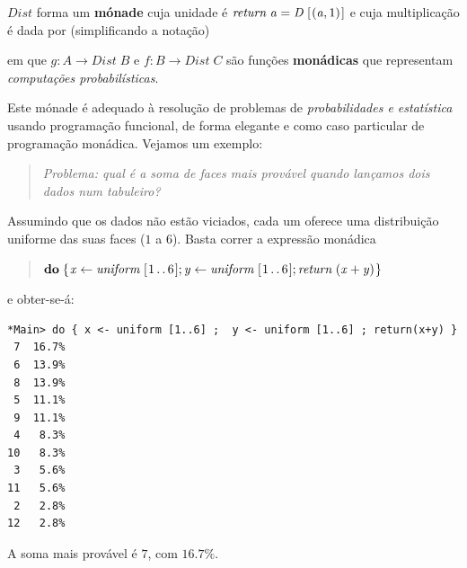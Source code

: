 \documentclass[a4paper]{article}
\newcommand{\Conid}[1]{\mathit{#1}}
\newcommand{\Varid}[1]{\mathit{#1}}
\def\resethooks{%
  \global\let\SaveRestoreHook\empty
  \global\let\ColumnHook\empty}
\let\hspre\empty
\let\hspost\empty
\def\kcomp{\mathbin{\bullet}}
\begin{document}
\ensuremath{\Conid{Dist}} forma um \textbf{mónade} cuja unidade é \ensuremath{\Varid{return}\;\Varid{a}\mathrel{=}\Conid{D}\;[\mskip1.5mu (\Varid{a},\mathrm{1})\mskip1.5mu]} e cuja multiplicação é dada por
(simplificando a notação)
\resethooks
em que \ensuremath{\Varid{g}\mathbin{:}\Conid{A}\to \Conid{Dist}\;\mathit B} e \ensuremath{\Varid{f}\mathbin{:}\mathit B\to \Conid{Dist}\;\mathit C} são funções \textbf{monádicas} que representam
\emph{computações probabilísticas}.

Este mónade é adequado à resolução de problemas de \emph{probabilidades e
estatística} usando programação funcional, de forma elegante e como caso
particular de programação monádica. Vejamos um exemplo:
\begin{quote}
\emph{Problema: qual é a soma de faces mais provável quando lançamos dois dados num tabuleiro?}
\end{quote}
Assumindo que os dados não estão viciados, cada um oferece uma distribuição uniforme
das suas faces (\ensuremath{\mathrm{1}} a \ensuremath{\mathrm{6}}). Basta correr a expressão monádica
\begin{quote}
\ensuremath{\mathbf{do}\;\{\mskip1.5mu \Varid{x}\leftarrow \Varid{uniform}\;[\mskip1.5mu \mathrm{1}\mathinner{\ldotp\ldotp}\mathrm{6}\mskip1.5mu];\Varid{y}\leftarrow \Varid{uniform}\;[\mskip1.5mu \mathrm{1}\mathinner{\ldotp\ldotp}\mathrm{6}\mskip1.5mu];\Varid{return}\;(\Varid{x}\mathbin{+}\Varid{y})\mskip1.5mu\}}
\end{quote}
e obter-se-á:
\begin{Verbatim}[fontsize=\small]
*Main> do { x <- uniform [1..6] ;  y <- uniform [1..6] ; return(x+y) }
 7  16.7%
 6  13.9%
 8  13.9%
 5  11.1%
 9  11.1%
 4   8.3%
10   8.3%
 3   5.6%
11   5.6%
 2   2.8%
12   2.8%
\end{Verbatim}
A soma mais provável é \ensuremath{\mathrm{7}}, com \ensuremath{\mathrm{16.7}\mathbin{\%}}.
\end{document}
